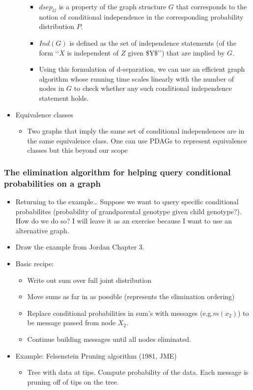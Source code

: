 \documentclass[10pt,containsverbatim,paralist]{article}
\begin{document}
\begin{itemize}
\begin{itemize}
\begin{itemize}
\item $dsep_G$ is a property of the graph structure $G$ that corresponds to the notion of conditional independence in the corresponding probability distribution $P$.
\label{sec-1-1-4-2-2-2}
\item $Ind(G)$ is defined as the set of independence statements (of the form ‘‘$X$ is independent of $Z$ given \$Y\$’’) that are implied by $G$.
\label{sec-1-1-4-2-2-3}
\item Using this formulation of d-separation, we can use an efficient graph algorithm whose running time scales linearly with the number of nodes in $G$ to check whether any such conditional independence statement holds.
\label{sec-1-1-4-2-2-4}
\end{itemize}
\end{itemize}
\item Equivalence classes
\label{sec-1-1-4-3}
\begin{itemize}
\item Two graphs that imply the same set of conditional independences are in the same equivalence class.  One can use PDAGs to represent equivalence classes but this beyond our scope
\label{sec-1-1-4-3-1}
\end{itemize}
\end{itemize}
\subsubsection*{The elimination algorithm for helping query conditional probabilities on a graph}
\label{sec-1-1-5}
\begin{itemize}
\item Returning to the example\ldots{} Suppose we want to query specific conditional probabilites (probability of grandparental genotype given child genotype?). How do we do so?  I will leave it as an exercise because I want to use an alternative graph.
\label{sec-1-1-5-1}
\item Draw the example from Jordan Chapter 3.
\label{sec-1-1-5-2}
\item Basic recipe:
\label{sec-1-1-5-3}
\begin{itemize}
\item Write out sum over full joint distribution
\label{sec-1-1-5-3-1}
\item Move sums as far in as possible (represents the elimination ordering)
\label{sec-1-1-5-3-2}
\item Replace conditional probabilities in sum's with messages (e.g.$m(x_2)$) to be message passed from node $X_2$.
\label{sec-1-1-5-3-3}
\item Continue building messages until all nodes eliminated.
\label{sec-1-1-5-3-4}
\end{itemize}
\item Example: Felsenstein Pruning algorithm (1981, JME)
\label{sec-1-1-5-4}
\begin{itemize}
\item Tree with data at tips.  Compute probability of the data. Each message is pruning off of tips on the tree.
\label{sec-1-1-5-4-1}
\end{itemize}
\end{itemize}
\end{document}
